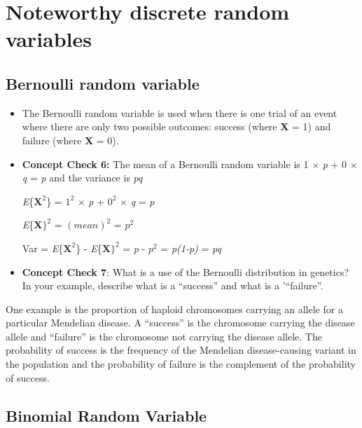 \documentclass[12pt]{report}
\begin{document}
\section{Noteworthy discrete random variables}

\subsection{Bernoulli random variable}

\begin{itemize}

\item The Bernoulli random variable is used when there is one trial of an event where there are only two possible outcomes: success (where \textbf{X} = 1) and failure (where \textbf{X} = 0). 

\item \textbf{Concept Check 6:}  The mean of a Bernoulli random variable is \color{red} 1 $\times$ \textit{p} + 0 $\times$ \textit{q}  = \textit{p}
\color{black}
and the variance is \color{red} \textit{pq}

\bigskip
\textit{E}\{$\textbf{X}^{2}$\} = $1^{2}$  $\times$ \textit{p} + $0^{2}$  $\times$ \textit{q} = \textit{p}
 
\textit{E}\{$\textbf{X}\}^{2}$ = $(mean)^{2}$ = $p^{2}$

Var =  \textit{E}\{$\textbf{X}^{2}$\} -  \textit{E}\{$\textbf{X}\}^{2}$ = \textit{p} - $p^2$ = \textit{p(1-p)} = \textit{pq}



\color{black}
\item \textbf{Concept Check 7}: What is a use of the Bernoulli distribution in genetics? In your example, describe what is a ``success'' and what is a '``failure''.  

\end{itemize}
\bigskip

\color{red} One example is the proportion of haploid chromosomes carrying an allele for a particular Mendelian disease. A ``success'' is the chromosome carrying the disease allele and ``failure'' is the chromosome not carrying the disease allele. The probability of success is the frequency of the Mendelian disease-causing variant in the population and the probability of failure is the complement of the probability of success. 

\color{black}
\subsection{Binomial Random Variable}
\end{document}
